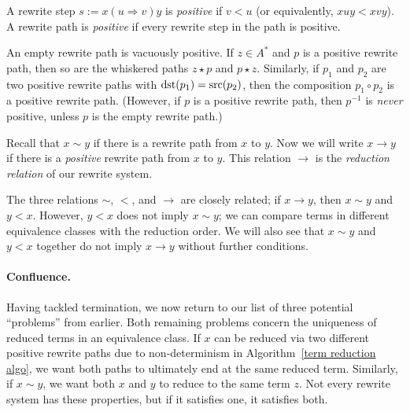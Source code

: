 \documentclass[../generics]{subfiles}
\begin{document}
\begin{definition}
A rewrite step $s := x(u\Rightarrow v)y$ is \emph{positive} if $v<u$ (or equivalently, $xuy<xvy$). A rewrite path is \emph{positive} if every rewrite step in the path is positive.
\end{definition}
An empty rewrite path is vacuously positive. If $z\in A^*$ and $p$ is a positive rewrite path, then so are the whiskered paths $z\star p$ and $p\star z$. Similarly, if $p_1$ and $p_2$ are two positive rewrite paths with $\operatorname{dst}(p_1)=\operatorname{src}(p_2)$, then the composition $p_1\circ p_2$ is a positive rewrite path. (However, if $p$ is a positive rewrite path, then $p^{-1}$ is \emph{never} positive, unless $p$ is the empty rewrite path.)
\begin{definition}
Recall that $x\sim y$ if there is a rewrite path from $x$ to $y$. Now we will write $x\rightarrow y$ if there is a \emph{positive} rewrite path from $x$ to $y$. This relation \index{$\rightarrow$}$\rightarrow$ is the \emph{reduction relation} of our rewrite system.
\end{definition}

The three relations $\sim$, $<$, and $\rightarrow$ are closely related; if $x\rightarrow y$, then $x\sim y$ and $y<x$. However, $y<x$ does not imply $x\sim y$; we can compare terms in different equivalence classes with the reduction order. We will also see that $x\sim y$ and $y<x$ together do not imply $x\rightarrow y$ without further conditions.

\paragraph{Confluence.}
Having tackled termination, we now return to our list of three potential ``problems'' from earlier. Both remaining problems concern the uniqueness of reduced terms in an equivalence class. If $x$ can be reduced via two different positive rewrite paths due to non-determinism in Algorithm~\ref{term reduction algo}, we want both paths to ultimately end at the same reduced term. Similarly, if $x\sim y$, we want both $x$ and $y$ to reduce to the same term $z$. Not every rewrite system has these properties, but if it satisfies one, it satisfies both.
\end{document}
